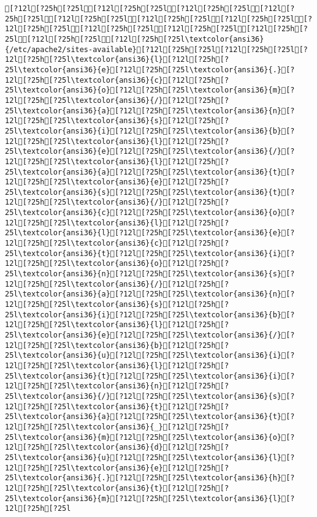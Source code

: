 \documentclass{scrartcl}
\begin{document}
\begin{Verbatim}
[?12l[?25h[?25l[?12l[?25h[?25l[?12l[?25h[?25l[?12l[?25h[?25l[?12l[?25h[?25l[?12l[?25h[?25l[?12l[?25h[?25l[?12l[?25h[?25l[?12l[?25h[?25l[?12l[?25h[?25l[?12l[?25h[?25l[?12l[?25h[?25l[?12l[?25h[?25l\textcolor{ansi36}{/etc/apache2/sites-available}[?12l[?25h[?25l[?12l[?25h[?25l[?12l[?25h[?25l\textcolor{ansi36}{l}[?12l[?25h[?25l\textcolor{ansi36}{e}[?12l[?25h[?25l\textcolor{ansi36}{.}[?12l[?25h[?25l\textcolor{ansi36}{c}[?12l[?25h[?25l\textcolor{ansi36}{o}[?12l[?25h[?25l\textcolor{ansi36}{m}[?12l[?25h[?25l\textcolor{ansi36}{/}[?12l[?25h[?25l\textcolor{ansi36}{a}[?12l[?25h[?25l\textcolor{ansi36}{n}[?12l[?25h[?25l\textcolor{ansi36}{s}[?12l[?25h[?25l\textcolor{ansi36}{i}[?12l[?25h[?25l\textcolor{ansi36}{b}[?12l[?25h[?25l\textcolor{ansi36}{l}[?12l[?25h[?25l\textcolor{ansi36}{e}[?12l[?25h[?25l\textcolor{ansi36}{/}[?12l[?25h[?25l\textcolor{ansi36}{l}[?12l[?25h[?25l\textcolor{ansi36}{a}[?12l[?25h[?25l\textcolor{ansi36}{t}[?12l[?25h[?25l\textcolor{ansi36}{e}[?12l[?25h[?25l\textcolor{ansi36}{s}[?12l[?25h[?25l\textcolor{ansi36}{t}[?12l[?25h[?25l\textcolor{ansi36}{/}[?12l[?25h[?25l\textcolor{ansi36}{c}[?12l[?25h[?25l\textcolor{ansi36}{o}[?12l[?25h[?25l\textcolor{ansi36}{l}[?12l[?25h[?25l\textcolor{ansi36}{l}[?12l[?25h[?25l\textcolor{ansi36}{e}[?12l[?25h[?25l\textcolor{ansi36}{c}[?12l[?25h[?25l\textcolor{ansi36}{t}[?12l[?25h[?25l\textcolor{ansi36}{i}[?12l[?25h[?25l\textcolor{ansi36}{o}[?12l[?25h[?25l\textcolor{ansi36}{n}[?12l[?25h[?25l\textcolor{ansi36}{s}[?12l[?25h[?25l\textcolor{ansi36}{/}[?12l[?25h[?25l\textcolor{ansi36}{a}[?12l[?25h[?25l\textcolor{ansi36}{n}[?12l[?25h[?25l\textcolor{ansi36}{s}[?12l[?25h[?25l\textcolor{ansi36}{i}[?12l[?25h[?25l\textcolor{ansi36}{b}[?12l[?25h[?25l\textcolor{ansi36}{l}[?12l[?25h[?25l\textcolor{ansi36}{e}[?12l[?25h[?25l\textcolor{ansi36}{/}[?12l[?25h[?25l\textcolor{ansi36}{b}[?12l[?25h[?25l\textcolor{ansi36}{u}[?12l[?25h[?25l\textcolor{ansi36}{i}[?12l[?25h[?25l\textcolor{ansi36}{l}[?12l[?25h[?25l\textcolor{ansi36}{t}[?12l[?25h[?25l\textcolor{ansi36}{i}[?12l[?25h[?25l\textcolor{ansi36}{n}[?12l[?25h[?25l\textcolor{ansi36}{/}[?12l[?25h[?25l\textcolor{ansi36}{s}[?12l[?25h[?25l\textcolor{ansi36}{t}[?12l[?25h[?25l\textcolor{ansi36}{a}[?12l[?25h[?25l\textcolor{ansi36}{t}[?12l[?25h[?25l\textcolor{ansi36}{_}[?12l[?25h[?25l\textcolor{ansi36}{m}[?12l[?25h[?25l\textcolor{ansi36}{o}[?12l[?25h[?25l\textcolor{ansi36}{d}[?12l[?25h[?25l\textcolor{ansi36}{u}[?12l[?25h[?25l\textcolor{ansi36}{l}[?12l[?25h[?25l\textcolor{ansi36}{e}[?12l[?25h[?25l\textcolor{ansi36}{.}[?12l[?25h[?25l\textcolor{ansi36}{h}[?12l[?25h[?25l\textcolor{ansi36}{t}[?12l[?25h[?25l\textcolor{ansi36}{m}[?12l[?25h[?25l\textcolor{ansi36}{l}[?12l[?25h[?25l

\end{Verbatim}
\end{document}
